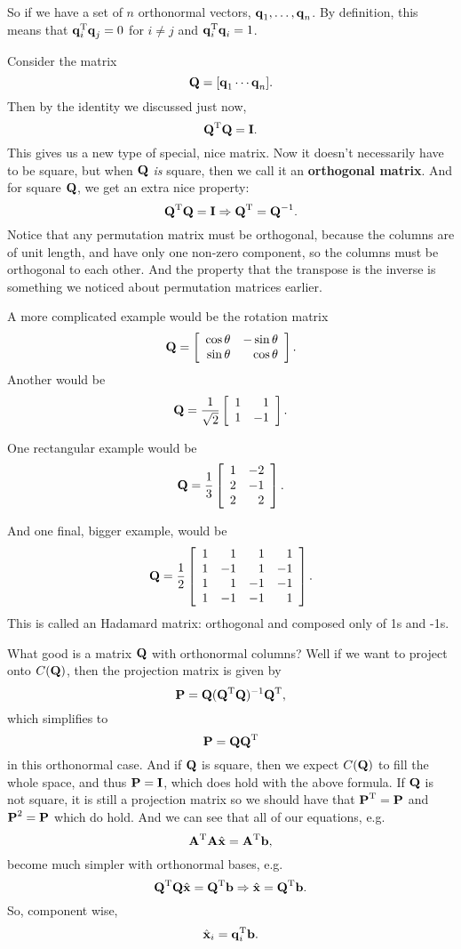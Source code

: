 So if we have a set of $n$ orthonormal vectors, $\vq_1,\ldots,\vq_n$. By definition, this means that $\T{\vq_i}\vq_j = 0$ for $i\ne j$ and $\T{\vq_i}\vq_i = 1$. 

Consider the matrix
\[ \mQ = [\vq_1 \cdots \vq_n]. \]
Then by the identity we discussed just now, 
\[ \T\mQ\mQ = \mI. \]
This gives us a new type of special, nice matrix. Now it doesn't necessarily have to be square, but when $\mQ$ \textit{is} square, then we call it an \textbf{orthogonal matrix}. And for square $\mQ$, we get an extra nice property:
\[ \T\mQ \mQ = \mI \Rightarrow \T\mQ = \mQ^{-1}. \]
\bex
Notice that any permutation matrix must be orthogonal, because the columns are of unit length, and have only one non-zero component, so the columns must be orthogonal to each other. And the property that the transpose is the inverse is something we noticed about permutation matrices earlier.

A more complicated example would be the rotation matrix
\[ \mQ = \mat{\cos \theta & -\sin \theta \\ \sin \theta & \cos \theta}. \]
Another would be
\[ \mQ = \frac 1{\sqrt{2}} \mat{1&1\\1&-1}. \]

One rectangular example would be
\[ \mQ = \frac 13 \mat{1&-2\\2&-1\\2&2}. \]

And one final, bigger example, would be
\[ \mQ = \frac 12 \mat{1&1&1&1\\1&-1&1&-1\\1&1&-1&-1\\1&-1&-1&1}. \]
This is called an Hadamard matrix: orthogonal and composed only of 1s and -1s.
\eex

What good is a matrix $\mQ$ with orthonormal columns? Well if we want to project onto $C(\mQ)$, then the projection matrix is given by
\[ \mP = \mQ(\T\mQ\mQ)^{-1}\T\mQ, \]
which simplifies to
\[ \mP = \mQ\T\mQ \]
in this orthonormal case. And if $\mQ$ is square, then we expect $C(\mQ)$ to fill the whole space, and thus $\mP = \mI$, which does hold with the above formula. If $\mQ$ is not square, it is still a projection matrix so we should have that $\T\mP = \mP$ and $\mP^2 = \mP$ which do hold. And we can see that all of our equations, e.g.
\[ \T\mA \mA \hat{\vx} = \T\mA \vb, \]
become much simpler with orthonormal bases, e.g.
\[ \T\mQ\mQ \hat{\vx} = \T\mQ\vb \Rightarrow \hat{\vx} = \T\mQ \vb. \]
So, component wise,
\[ \hat{\vx}_i = \T{\vq_i}\vb. \] 

